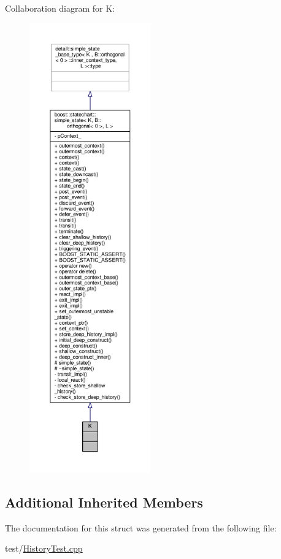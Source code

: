 Collaboration diagram for K\+:
\nopagebreak
\begin{figure}[H]
\begin{center}
\leavevmode
\includegraphics[height=550pt]{struct_k__coll__graph}
\end{center}
\end{figure}
\subsection*{Additional Inherited Members}


The documentation for this struct was generated from the following file\+:\begin{DoxyCompactItemize}
\item 
test/\mbox{\hyperlink{_history_test_8cpp}{History\+Test.\+cpp}}\end{DoxyCompactItemize}
